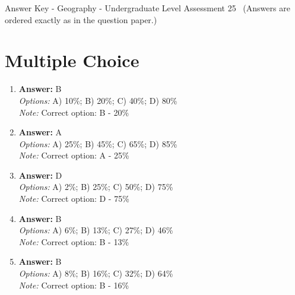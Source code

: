 \documentclass[12pt]{article}
\begin{document}
\begin{center}
Answer Key - Geography - Undergraduate Level Assessment 25 \
\small (Answers are ordered exactly as in the question paper.)
\end{center}

\section*{Multiple Choice}
\begin{enumerate}[label=\arabic*.]
\item \textbf{Answer:} B
\\ \textit{Options:} A) 10\%; B) 20\%; C) 40\%; D) 80\%
\\ \textit{Note:} Correct option: B - 20\%
\item \textbf{Answer:} A
\\ \textit{Options:} A) 25\%; B) 45\%; C) 65\%; D) 85\%
\\ \textit{Note:} Correct option: A - 25\%
\item \textbf{Answer:} D
\\ \textit{Options:} A) 2\%; B) 25\%; C) 50\%; D) 75\%
\\ \textit{Note:} Correct option: D - 75\%
\item \textbf{Answer:} B
\\ \textit{Options:} A) 6\%; B) 13\%; C) 27\%; D) 46\%
\\ \textit{Note:} Correct option: B - 13\%
\item \textbf{Answer:} B
\\ \textit{Options:} A) 8\%; B) 16\%; C) 32\%; D) 64\%
\\ \textit{Note:} Correct option: B - 16\%
\end{enumerate}
\end{document}
